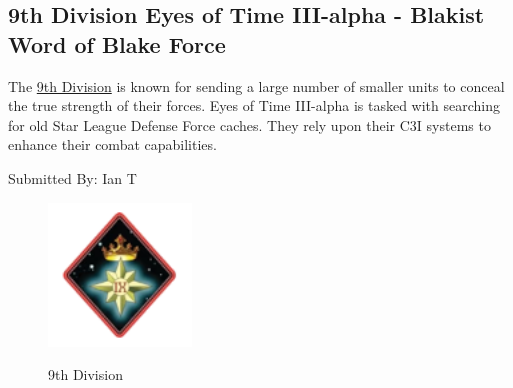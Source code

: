 \subsection{9th Division Eyes of Time III-alpha - Blakist Word of Blake Force}

The \href{https://www.sarna.net/wiki/9th_Division_(Word_of_Blake)}{9th Division} is known for sending a large number of smaller units to conceal the true strength of their forces.
Eyes of Time III-alpha is tasked with searching for old Star League Defense Force caches.
They rely upon their C3I systems to enhance their combat capabilities.

Submitted By: Ian T

\begin{figure}[!h]
  \centering
  \includegraphics[alt='9th Division Logo', width=1.5in, height=1.5in]{img/9th-Division.png}
  \caption*{9th Division}
\end{figure}

